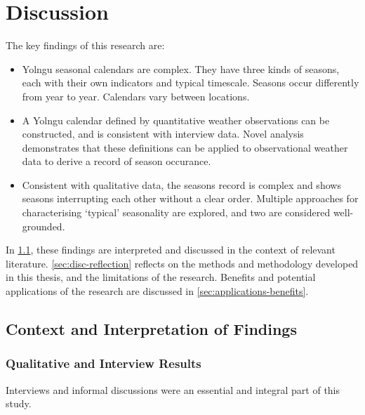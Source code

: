 \chapter{Discussion}
\label{ch:discussion}

The key findings of this research are:
\begin{itemize}
\item Yolngu seasonal calendars are complex.  They have three kinds of
    seasons, each with their own indicators and typical timescale.  Seasons
    occur differently from year to year.  Calendars vary between locations.

\item A Yolngu calendar defined by quantitative weather observations can be constructed,
    and is consistent with interview data.  Novel analysis demonstrates that
    these definitions can be applied to observational weather data to derive
    a record of season occurance.

\item Consistent with qualitative data, the seasons record is complex and
    shows seasons interrupting each other without a clear order.  Multiple
    approaches for characterising `typical' seasonality are explored, and
    two are considered well-grounded.
\end{itemize}

In \cref{sec:disc-results}, these findings are interpreted and discussed in
the context of relevant literature.  \cref{sec:disc-reflection} reflects on
the methods and methodology developed in this thesis, and the limitations
of the research.  Benefits and potential applications of the research are
discussed in \cref{sec:applications-benefits}.


\section{Context and Interpretation of Findings}
\label{sec:disc-results}

\subsection{Qualitative and Interview Results}

Interviews and informal discussions were an essential and integral part of
this study.

